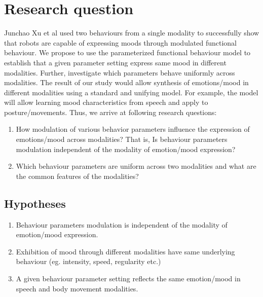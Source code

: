 \documentclass[runningheads]{llncs}
\begin{document}
\section{Research question}
Junchao Xu et al \cite{joost} used two behaviours from a single modality to successfully show that robots are capable of expressing moods through modulated functional behaviour. We propose to use the parameterized functional behaviour model to establish that a given parameter setting express same mood in different modalities. Further, investigate which parameters behave uniformly across modalities. The result of our study would allow synthesis of emotions/mood in different modalities using a standard and unifying model. For example, the model will allow learning mood characteristics from speech and apply to posture/movements. Thus, we arrive at following research questions:
\begin{enumerate}
    \item How modulation of various behavior parameters influence the expression of emotions/mood across modalities? That is, Is behaviour parameters modulation independent of the modality of emotion/mood expression?
 \item Which behaviour parameters are uniform across two modalities and what are the common features of the modalities?
\end{enumerate}
\subsection{Hypotheses}
\begin{enumerate}
\item Behaviour parameters modulation is independent of the modality of emotion/mood expression.
\item Exhibition of mood through different modalities have same underlying behaviour (eg. intensity, speed, regularity etc.)
\item A given behaviour parameter setting reflects the same emotion/mood in speech and body movement modalities.

\end{enumerate}
\end{document}
